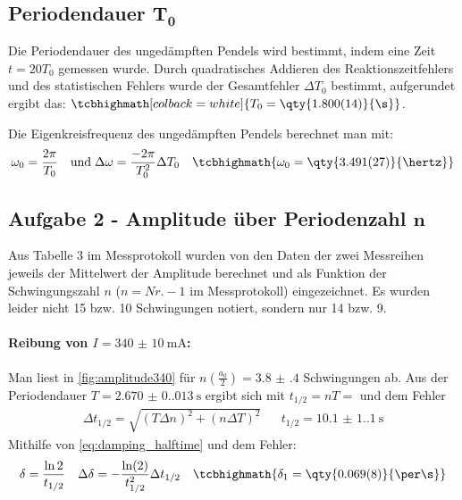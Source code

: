 \subsection[\texorpdfstring{Periodendauer \(T_0\)}{Periodendauer T0}]{Periodendauer \(\boldsymbol{T_0}\)}
\label{subsection:w_0}
Die Periodendauer des ungedämpften Pendels wird bestimmt, indem eine Zeit \(t=20T_0\) gemessen wurde. Durch quadratisches Addieren des Reaktionszeitfehlers und des statistischen Fehlers wurde der Gesamtfehler \(\Delta T_0\) bestimmt, aufgerundet ergibt das:
\(\tcbhighmath[colback=white]{T_0=\qty{1.800(14)}{\s}}\).

Die Eigenkreisfrequenz des ungedämpften Pendels berechnet man mit:
\begin{align}
    \omega_0=\frac{2\pi}{T_0}&&\text{und}\;\Delta \omega=\frac{-2\pi}{T_0^2}\Delta T_0&&\tcbhighmath{\omega_0=\qty{3.491(27)}{\hertz}}
\end{align}

\subsection[\texorpdfstring{Aufgabe 2 - Amplitude über Periodenzahl \(n\)}{Aufgabe 2 - Amplitude über Periodenzahl n}]{Aufgabe 2 - Amplitude über Periodenzahl \(\boldsymbol{n}\)}
Aus Tabelle 3 im Messprotokoll wurden von den Daten der zwei Messreihen jeweils der Mittelwert der Amplitude berechnet und als Funktion der Schwingungszahl \(n\) (\(n=Nr. -1\) im Messprotokoll) eingezeichnet. Es wurden leider nicht 15 bzw. 10 Schwingungen notiert, sondern nur 14 bzw. 9.
\paragraph{Reibung von \(I=\qty{340(10)}{\milli\ampere}\):}
\label{sec:340mA}
Man liest in \cref{fig:amplitude340} für \(n(\frac{a_0}{2})=\num{3.8(4)}\) Schwingungen ab. 
Aus der Periodendauer \(T=\qty{2.670(0.013)}{\s}\) ergibt sich mit \(t_{1/2}=nT=\) und dem Fehler 
\begin{align}
    \Delta t_{1/2}=\sqrt{\left(T \Delta n\right)^2+\left(n \Delta T\right)^2}&&t_{1/2}=\qty{10.1(1.1)}{\s}
\end{align}
Mithilfe von \cref{eq:damping_halftime} und dem Fehler:
\begin{align}
    \delta = \frac{\ln 2}{t_{1/2}}&&\Delta \delta = -\frac{\ln(2)}{t_{1/2}^2}\Delta t_{1/2}&&\tcbhighmath{\delta_1=\qty{0.069(8)}{\per\s}}
\end{align}


